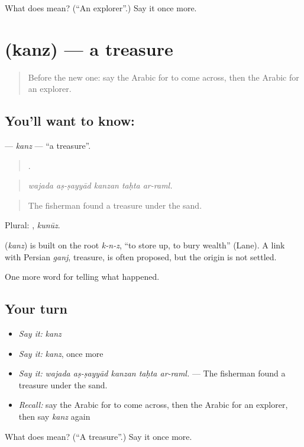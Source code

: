 \begin{tcolorbox}[breakable,colback=teal!4,colframe=teal!35!black,title={Before you move on}]
What does  mean? (\textquotedblleft{}An explorer\textquotedblright{}.) Say it once more.
\end{tcolorbox}
\section[\texorpdfstring{\ar{كنز} (kanz)}{كنز (kanz)}]{ (kanz) — a treasure}

\label{lesson:AR-C312-kanz}



\begin{quote}
Before the new one: say the Arabic for to come across, then the Arabic for an explorer.
\end{quote}

\subsection*{You'll want to know: }
\textbf{} — \emph{kanz} — \textquotedblleft{}a treasure\textquotedblright{}.

\begin{quote}
    .
\end{quote}

\begin{quote}
\emph{wajada aṣ-ṣayyād kanzan taḥta ar-raml.}
\end{quote}

\begin{quote}
The fisherman found a treasure under the sand.
\end{quote}

Plural: , \emph{kunūz}.

\begin{cousinweb}
\textbf{} (\emph{kanz}) is built on the root \emph{k-n-z}, \textquotedblleft{}to store up, to bury wealth\textquotedblright{} (Lane). A link with Persian \emph{ganj}, treasure, is often proposed, but the origin is not settled.
\end{cousinweb}

\begin{grammarlens}[title={What you've built}]
One more word for telling what happened.
\end{grammarlens}

\subsection*{Your turn}
\begin{itemize}
\raggedright
  \item \emph{Say it:} \emph{kanz}
  \item \emph{Say it:} \emph{kanz}, once more
  \item \emph{Say it:} \emph{wajada aṣ-ṣayyād kanzan taḥta ar-raml.} — The fisherman found a treasure under the sand.
  \item \emph{Recall:} say the Arabic for to come across, then the Arabic for an explorer, then say \emph{kanz} again
\end{itemize}

\begin{tcolorbox}[breakable,colback=teal!4,colframe=teal!35!black,title={Before you move on}]
What does  mean? (\textquotedblleft{}A treasure\textquotedblright{}.) Say it once more.
\end{tcolorbox}
